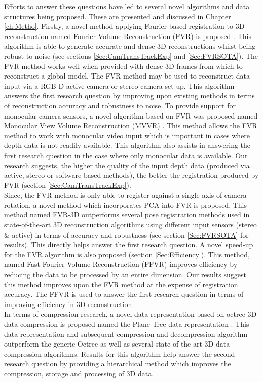 Efforts to answer these questions have led to several novel algorithms and data structures being proposed. These are presented and discussed in Chapter \ref{ch:Metho}. Firstly, a novel method applying Fourier based registration to 3D reconstruction named Fourier Volume Reconstruction (FVR) is proposed \cite{Lincoln16Fourier,Lincoln16Dense}. This algorithm is able to generate accurate and dense 3D reconstructions whilst being robust to noise (see sections \ref{Sec:CamTransTrackExp} and \ref{Sec:FVRSOTA}). The FVR method works well when provided with dense 3D frames from which to reconstruct a global model. The FVR method may be used to reconstruct data input via a RGB-D active camera or stereo camera set-up. This algorithm answers the first research question by improving upon existing methods in terms of reconstruction accuracy and robustness to noise. To provide support for monocular camera sensors, a novel algorithm based on FVR was proposed named Monocular View Volume Reconstruction (MVVR) \cite{Lincoln16Monocular}. This method allows the FVR method to work with monocular video input which is important in cases where depth data is not readily available. This algorithm also assists in answering the first research question in the case where only monocular data is available. Our research suggests, the higher the quality of the input depth data (produced via active, stereo or software based methods), the better the registration produced by FVR (section \ref{Sec:CamTransTrackExp}). \\

Since, the FVR method is only able to register against a single axis of camera rotation, a novel method which incorporates PCA into FVR is proposed. This method named FVR-3D outperforms several pose registration methods used in state-of-the-art 3D reconstruction algorithms using different input sensors (stereo \& active) in terms of accuracy and robustness (see section \ref{Sec:FVRSOTA} for results). This directly helps answer the first research question. A novel speed-up for the FVR algorithm is also proposed (section \ref{Sec:Efficiency}). This method, named Fast Fourier Volume Reconstruction (FFVR) improves efficiency by reducing the data to be processed by an entire dimension. Our results suggest this method improves upon the FVR method at the expense of registration accuracy. The FFVR is used to answer the first research question in terms of improving efficiency in 3D reconstruction. \\

In terms of compression research, a novel data representation based on octree 3D data compression is proposed named the Plane-Tree data representation \cite{Lincoln15Plane}. This data representation and subsequent compression and decompression algorithm outperform the generic Octree as well as several state-of-the-art 3D data compression algorithms. Results for this algorithm help answer the second research question by providing a hierarchical method which improves the compression, storage and processing of 3D data. \\

